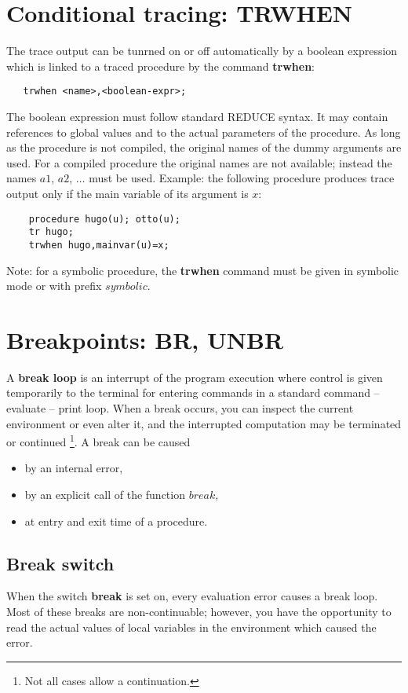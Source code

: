 \section{Conditional tracing: TRWHEN}

The trace output can be tunrned on or off automatically by
a boolean expression which is linked to a traced procedure
by the command {\bf trwhen}:
\begin{verbatim}
   trwhen <name>,<boolean-expr>;
\end{verbatim}
The boolean expression must follow
standard {\small REDUCE} syntax. It may contain references
to global values and to
the actual parameters of the procedure. As long as the
procedure is not compiled, the original names of the dummy arguments
are used. For a compiled procedure the  original names 
are not available; instead the names $a1$, $a2$, $\ldots$
must be used. Example: the following procedure produces trace
output only if the main variable of its argument is $x$:
\begin{verbatim}
    procedure hugo(u); otto(u);
    tr hugo;
    trwhen hugo,mainvar(u)=x;
\end{verbatim}
Note: for a symbolic procedure, the {\bf trwhen} command
must be given in symbolic mode or with prefix $symbolic$.

\section{Breakpoints: BR, UNBR}

A {\bf break loop} is an interrupt of the program execution
where control is given temporarily to the terminal for
entering commands in a standard command -- evaluate -- print loop. 
When a break occurs, you can inspect the current
 environment or even alter it, and the
interrupted computation may be terminated or continued
\footnote{Not all cases allow a continuation.}. A break can be
caused
\begin{itemize}
\item by an internal error,
\item by an explicit call of the function $break$,
\item at entry and exit time of a procedure.
\end{itemize}

\subsection{Break switch}
When the switch {\bf break} is set on, every
evaluation error causes a break loop. Most of these
breaks are non-continuable; however, you have the 
opportunity to read the actual values of local variables
in the environment which caused the error.

